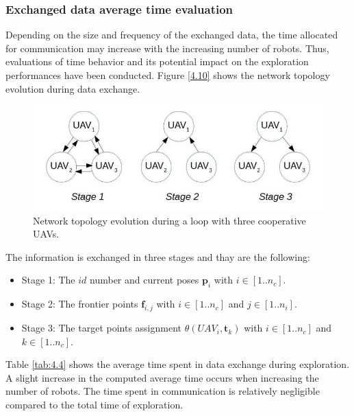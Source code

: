 \documentclass[11pt,openany]{book}
\begin{document}
\subsubsection{Exchanged data average time evaluation}
Depending on the size and frequency of the exchanged data, the time allocated for communication may increase with the increasing number of robots. Thus, evaluations of time behavior and its potential impact on the exploration performances have been conducted. Figure \ref{4.10} shows the network topology evolution during data exchange.
\begin{figure}[H]
    \centering
    \includegraphics[scale=0.4]{assets/4_10.png}
    \caption{Network topology evolution during a loop with three cooperative UAVs.}
    \label{fig:4.10}
\end{figure}
The information is exchanged in three stages and thay are the following:
\begin{itemize}
    \item Stage 1: The $id$ number and current poses $\mathbf{p}_i$ with $i \in [1..n_c].$
    \item Stage 2: The frontier points $\mathbf{f}_{i,j}$ with $i \in [1..n_c]$ and $j \in [1..n_i]$.
    \item Stage 3: The target points assignment $\theta(UAV_i,\mathbf{t}_k)$ with $i \in [1..n_c]$ and $k \in [1..n_c]$.
\end{itemize}
Table \ref{tab:4.4} shows the average time spent in data exchange during exploration. A slight increase in the computed average time occurs when increasing the number of robots. The time spent in communication is relatively negligible compared to the total time of exploration.
\end{document}
